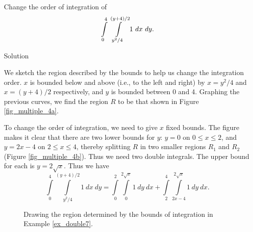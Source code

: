 \begin{example}\label{ex_double7}
Change the order of integration of $$\ds\int\limits_0^4\int\limits_{y^2/4}^{(y+4)/2}1\ dx\ dy.$$

Solution 

We sketch the region described by the bounds to help us change the integration order. $x$ is bounded below and above (i.e., to the left and right) by $x=y^2/4$ and $x=(y+4)/2$ respectively, and $y$ is bounded between 0 and 4. Graphing the previous curves, we find the region $R$ to be that shown in Figure \ref{fig_multiple_4a}. 


To change the order of integration, we need to give $x$ fixed bounds. The figure makes it clear that there are two lower bounds for $y$: $y=0$ on $0\leq x\leq 2$, and $y=2x-4$ on $2\leq x\leq 4$, thereby splitting $R$ in two smaller regions $R_1$ and $R_2$ (Figure \ref{fig_multiple_4b}). Thus we need two double integrals. The upper bound for each is $y=2\sqrt{x}$. Thus we have
$$\int\limits_0^4\int\limits_{y^2/4}^{(y+4)/2}1\ dx\ dy = \int\limits_0^2\int\limits_0^{2\sqrt{x}} 1\ dy\ dx + \int\limits_2^4\int\limits_{2x-4}^{2\sqrt{x}}1\ dy\ dx.$$



\begin{figure}[H]
\centering
\qquad
{}
\caption{Drawing the region determined by the bounds of integration in Example \ref{ex_double7}. }
\end{figure}


\end{example}

